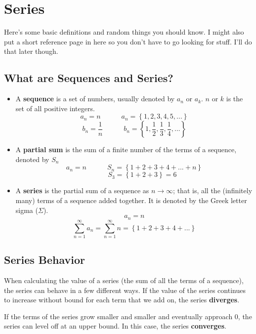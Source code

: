 \documentclass[12pt]{report}
\begin{document}
\chapter{Series}
Here's some basic definitions and random things you should know. I might also put a short reference page in here so you don't have to go looking for stuff. I'll do that later though. 

\section{What are Sequences and Series?}

\begin{itemize}
	\item[] A \textbf{sequence} is a set of numbers, usually denoted by $a_n$ or $a_k$. $n$ or $k$ is the set of all positive integers.
		$$ a_n = n \quad \quad \quad a_n = \left\{ 1, 2, 3, 4, 5, ... \right\} $$
		$$ b_n = \frac{1}{n} \quad \quad \quad b_n = \left\{ 1, \frac{1}{2}, \frac{1}{3}, \frac{1}{4}, ... \right\} $$
		
		
	
	\item[] A \textbf{partial sum} is the sum of a finite number of the terms of a sequence, denoted by $S_n$
		$$ a_n = n \quad \quad \quad S_n = \left\{1 + 2 + 3 + 4 + ... + n\right\} $$
		$$ \quad \quad \; S_3 = \left\{ 1 + 2 + 3 \right\} = 6 $$
		
		
	\item[] A \textbf{series} is the partial sum of a sequence as $n\to\infty$; that is, all the (infinitely many) terms of a sequence added together. It is denoted by the Greek letter sigma ($\Sigma$).
		$$ a_n = n $$
		$$ \sum_{n=1}^{\infty} a_n = \sum_{n=1}^{\infty} n = \left\{ 1 + 2 + 3 + 4 + ... \right\}$$
\end{itemize}

\clearpage

\section{Series Behavior}
When calculating the value of a series (the sum of all the terms of a sequence), the series can behave in a few different ways. If the value of the series continues to increase without bound for each term that we add on, the series \textbf{diverges}.

If the terms of the series grow smaller and smaller and eventually approach 0, the series can level off at an upper bound. In this case, the series \textbf{converges}.
\end{document}
